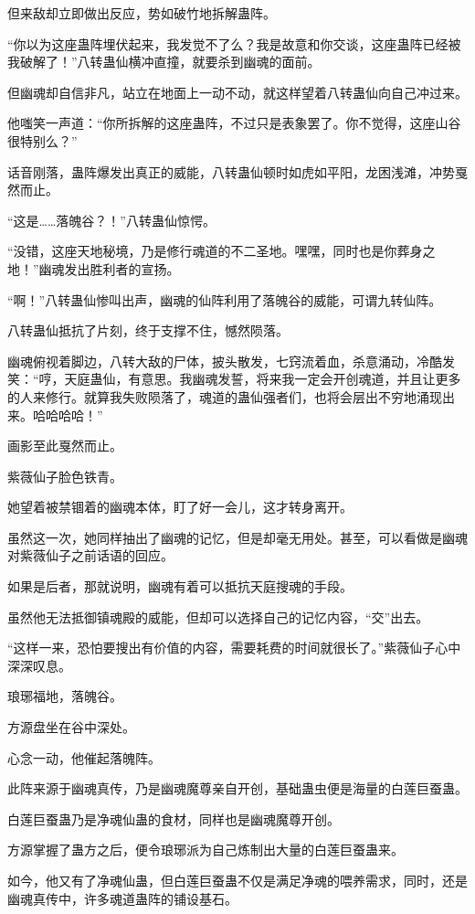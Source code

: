 \begin{this_body}
但来敌却立即做出反应，势如破竹地拆解蛊阵。

“你以为这座蛊阵埋伏起来，我发觉不了么？我是故意和你交谈，这座蛊阵已经被我破解了！”八转蛊仙横冲直撞，就要杀到幽魂的面前。

但幽魂却自信非凡，站立在地面上一动不动，就这样望着八转蛊仙向自己冲过来。

他嗤笑一声道：“你所拆解的这座蛊阵，不过只是表象罢了。你不觉得，这座山谷很特别么？”

话音刚落，蛊阵爆发出真正的威能，八转蛊仙顿时如虎如平阳，龙困浅滩，冲势戛然而止。

“这是……落魄谷？！”八转蛊仙惊愕。

“没错，这座天地秘境，乃是修行魂道的不二圣地。嘿嘿，同时也是你葬身之地！”幽魂发出胜利者的宣扬。

“啊！”八转蛊仙惨叫出声，幽魂的仙阵利用了落魄谷的威能，可谓九转仙阵。

八转蛊仙抵抗了片刻，终于支撑不住，憾然陨落。

幽魂俯视着脚边，八转大敌的尸体，披头散发，七窍流着血，杀意涌动，冷酷发笑：“哼，天庭蛊仙，有意思。我幽魂发誓，将来我一定会开创魂道，并且让更多的人来修行。就算我失败陨落了，魂道的蛊仙强者们，也将会层出不穷地涌现出来。哈哈哈哈！”

画影至此戛然而止。

紫薇仙子脸色铁青。

她望着被禁锢着的幽魂本体，盯了好一会儿，这才转身离开。

虽然这一次，她同样抽出了幽魂的记忆，但是却毫无用处。甚至，可以看做是幽魂对紫薇仙子之前话语的回应。

如果是后者，那就说明，幽魂有着可以抵抗天庭搜魂的手段。

虽然他无法抵御镇魂殿的威能，但却可以选择自己的记忆内容，“交”出去。

“这样一来，恐怕要搜出有价值的内容，需要耗费的时间就很长了。”紫薇仙子心中深深叹息。

琅琊福地，落魄谷。

方源盘坐在谷中深处。

心念一动，他催起落魄阵。

此阵来源于幽魂真传，乃是幽魂魔尊亲自开创，基础蛊虫便是海量的白莲巨蚕蛊。

白莲巨蚕蛊乃是净魂仙蛊的食材，同样也是幽魂魔尊开创。

方源掌握了蛊方之后，便令琅琊派为自己炼制出大量的白莲巨蚕蛊来。

如今，他又有了净魂仙蛊，但白莲巨蚕蛊不仅是满足净魂的喂养需求，同时，还是幽魂真传中，许多魂道蛊阵的铺设基石。


\end{this_body}
